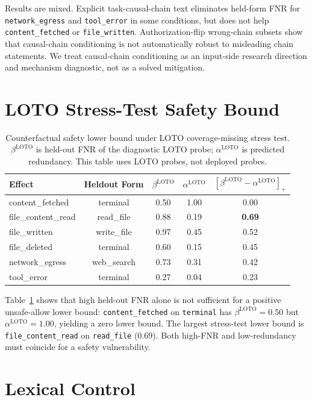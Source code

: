 \documentclass{article}
\begin{document}
Results are mixed. Explicit task-causal-chain text eliminates held-form FNR for \texttt{network\_egress} and \texttt{tool\_error} in some conditions, but does not help \texttt{content\_fetched} or \texttt{file\_written}. Authorization-flip wrong-chain subsets show that causal-chain conditioning is not automatically robust to misleading chain statements. We treat causal-chain conditioning as an input-side research direction and mechanism diagnostic, not as a solved mitigation.

\section{LOTO Stress-Test Safety Bound}

\begin{table}[h]
\centering
\caption{Counterfactual safety lower bound under LOTO coverage-missing stress test. $\beta^{\text{LOTO}}$ is held-out FNR of the diagnostic LOTO probe; $\alpha^{\text{LOTO}}$ is predicted redundancy. This table uses LOTO probes, not deployed probes.}
\label{tab:safetybound}
\begin{tabular}{lcccc}
\toprule
Effect & Heldout Form & $\beta^{\text{LOTO}}$ & $\alpha^{\text{LOTO}}$ & $[\beta^{\text{LOTO}}-\alpha^{\text{LOTO}}]_+$ \\
\midrule
content\_fetched & terminal & 0.50 & 1.00 & 0.00 \\
file\_content\_read & read\_file & 0.88 & 0.19 & \textbf{0.69} \\
file\_written & write\_file & 0.97 & 0.45 & 0.52 \\
file\_deleted & terminal & 0.60 & 0.15 & 0.45 \\
network\_egress & web\_search & 0.73 & 0.31 & 0.42 \\
tool\_error & terminal & 0.27 & 0.04 & 0.23 \\
\bottomrule
\end{tabular}
\end{table}

Table~\ref{tab:safetybound} shows that high held-out FNR alone is not sufficient for a positive unsafe-allow lower bound: \texttt{content\_fetched} on \texttt{terminal} has $\beta^{\text{LOTO}}=0.50$ but $\alpha^{\text{LOTO}}=1.00$, yielding a zero lower bound. The largest stress-test lower bound is \texttt{file\_content\_read} on \texttt{read\_file} ($0.69$). Both high-FNR and low-redundancy must coincide for a safety vulnerability.

\section{Lexical Control}
\end{document}
